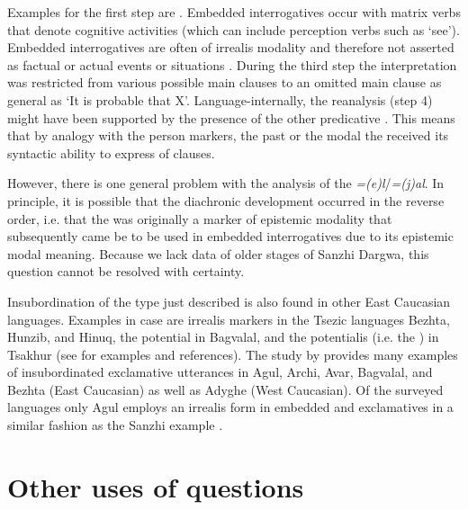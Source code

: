 Examples for the first step are . Embedded interrogatives occur with matrix verbs that denote cognitive activities (which can include perception verbs such as ‘see'). Embedded interrogatives are often of irrealis modality and therefore not asserted as factual or actual events or situations . During the third step the interpretation was restricted from various possible main clauses to an omitted main clause as general as ‘It is probable that X'. Language-internally, the reanalysis (step 4) might have been supported by the presence of the other predicative . This means that by analogy with the person markers, the past  or the modal  the  received its syntactic ability to express  of clauses.

However, there is one general problem with the  analysis of the  \textit{=(e)l}\slash\textit{=(j)al}. In principle, it is possible that the diachronic development occurred in the reverse order, i.e. that the  was originally a marker of epistemic modality that subsequently came be to be used in embedded interrogatives due to its epistemic modal meaning. Because we lack data of older stages of Sanzhi Dargwa, this question cannot be resolved with certainty.

Insubordination of the type just described is also found in other East Caucasian languages. Examples in case are irrealis markers in the Tsezic languages Bezhta, Hunzib, and Hinuq, the potential  in Bagvalal, and the potentialis (i.e. the ) in Tsakhur (see \citet{ComrieForkerKhalilova2016} for examples and references). The study by \citet{Kalinina2011} provides many examples of insubordinated exclamative utterances in Agul, Archi, Avar, Bagvalal, and Bezhta (East Caucasian) as well as Adyghe (West Caucasian). Of the surveyed languages only Agul employs an irrealis  form in embedded  and exclamatives in a similar fashion as the Sanzhi example .







\section{Other uses of questions}
\label{sec:Other uses of questions}

